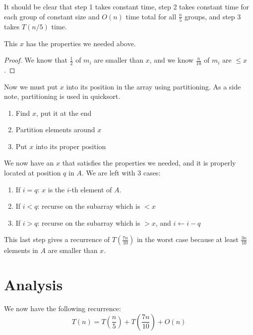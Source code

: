 It should be clear that step 1 takes constant time, step 2 takes
constant time for each group of constant size and $O(n)$ time total
for all $\frac{n}{5}$ groups, and step 3 takes $T(n/5)$ time.

\begin{claim}
This $x$ has the properties we needed above.
\end{claim}

\begin{proof}
We know that $\frac{1}{2}$ of $m_i$ are smaller than $x$, and we know $\frac{n}{10}$ of $m_i$ are $ \leq x $.
\end{proof}

Now we must put $x$ into its position in the array using partitioning.
As a side note, partitioning is used in quicksort.

\begin{enumerate}

\item Find $x$, put it at the end
\item Partition elements around $x$
\item Put $x$ into its proper position

\end{enumerate}

We now have an $x$ that satisfies the properties we needed, and it is
properly located at position $q$ in $A$.  We are left with 3 cases:

\begin{enumerate}

\item If $i = q$: $x$ is the $i$-th element of $A$.
\item If $i < q$: recurse on the subarray which is $ < x $

\item If $i > q$: recurse on the subarray which is $ > x $, and $ i
  \leftarrow i - q $

\end{enumerate}

This last step gives a recurrence of $ T \left( \frac{7n}{10} \right)
$ in the worst case because at least $ \frac{3n}{10} $ elements in $A$
are smaller than $x$.

\section{Analysis}

We now have the following recurrence:
%
\begin{displaymath}
T(n) = T \left( \frac{n}{5} \right) +T \left( \frac{7n}{10} \right) + O(n)
\end{displaymath}

